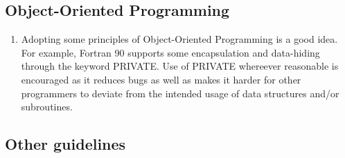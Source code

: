 \documentclass[preprint,aps]{revtex4}
\begin{document}
\subsection{Object-Oriented Programming}

\label{secOOP}

\begin{enumerate}
\item Adopting some principles of Object-Oriented Programming is a good
    idea. For example, Fortran 90 supports some encapsulation and
    data-hiding through the keyword PRIVATE. Use of PRIVATE whereever
    reasonable is encouraged as it reduces bugs as well as makes it
    harder for other programmers to deviate from the intended usage of
    data structures and/or subroutines.
\end{enumerate}

\subsection{Other guidelines}

\label{secMISCGUIDE}
\end{document}
